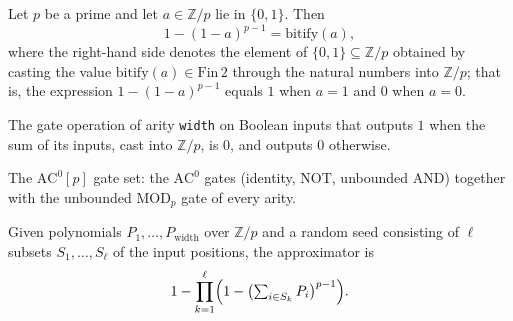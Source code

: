 \begin{lemma}
\label{RazborovSmolensky.bit_indicator_eq_bitify}
\leanok
{}
Let $p$ be a prime and let $a \in \mathbb{Z}/p$ lie in $\{0, 1\}$. Then
\[
1 - (1 - a)^{p-1} = \mathrm{bitify}(a),
\]
where the right-hand side denotes the element of $\{0,1\}\subseteq \mathbb{Z}/p$
obtained by casting the value $\mathrm{bitify}(a) \in \mathrm{Fin}\,2$ through the
natural numbers into $\mathbb{Z}/p$; that is, the expression $1 - (1 - a)^{p-1}$ equals
$1$ when $a = 1$ and $0$ when $a = 0$.
\end{lemma}

\begin{definition}
\label{RazborovSmolensky.modGateOp}
\leanok
The gate operation of arity \texttt{width} on Boolean inputs that outputs $1$ when the sum
of its inputs, cast into $\mathbb{Z}/p$, is $0$, and outputs $0$ otherwise.
\end{definition}

\begin{definition}
\label{RazborovSmolensky.ACp_GateOps}
\leanok
{}
The $\mathrm{AC}^0[p]$ gate set: the $\mathrm{AC}^0$ gates (identity, NOT, unbounded AND)
together with the unbounded $\mathrm{MOD}_p$ gate of every arity.
\end{definition}

\begin{definition}
\label{RazborovSmolensky.approxOr}
\leanok
Given polynomials $P_1,\dots,P_{\mathrm{width}}$ over $\mathbb{Z}/p$ and a random seed
consisting of $\ell$ subsets $S_1,\dots,S_\ell$ of the input positions, the approximator is
\[
1 - \prod_{k=1}^{\ell}\Bigl(1 - \bigl(\textstyle\sum_{i \in S_k} P_i\bigr)^{p-1}\Bigr).
\]
\end{definition}

